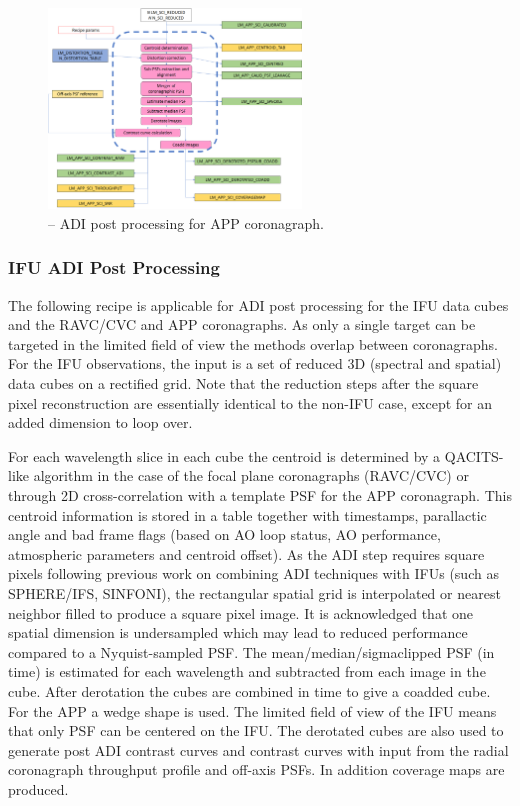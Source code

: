 \begin{figure}[hb]
  \centering
  \includegraphics[width=0.6\textwidth]{./figures/metis_lm_adi_app}
  \caption[Recipe: ]{ -- ADI post processing for APP coronagraph.
    }
  \label{fig:metis_lm_adi_app}
\end{figure}



\subsubsection{IFU ADI Post Processing}
\label{sssec:adi_ifu}


The following recipe is applicable for ADI post processing for the IFU
data cubes and the RAVC/CVC and APP coronagraphs. As only a single
target can be targeted in the limited field of view the methods
overlap between coronagraphs.  For the IFU observations, the input is
a set of reduced 3D (spectral and spatial) data cubes on a rectified
grid. Note that the reduction steps after the square pixel reconstruction
are essentially identical to the non-IFU case, except for an added dimension
to loop over. 

For each wavelength slice in each cube the centroid is determined by a
QACITS-like algorithm in the case of the focal plane coronagraphs
(RAVC/CVC) or through 2D cross-correlation with a template PSF for the
APP coronagraph. This centroid information is stored in a table
together with timestamps, parallactic angle and bad frame flags (based
on AO loop status, AO performance, atmospheric parameters and centroid
offset).  As the ADI step requires square pixels following previous
work on combining ADI techniques with IFUs (such as SPHERE/IFS,
SINFONI), the rectangular spatial grid is interpolated or nearest
neighbor filled to produce a square pixel image.  It is acknowledged
that one spatial dimension is undersampled which may lead to reduced
performance compared to a Nyquist-sampled PSF.  The
mean/median/sigmaclipped PSF (in time) is estimated for each
wavelength and subtracted from each image in the cube.  After
derotation the cubes are combined in time to give a coadded cube. For
the APP a wedge shape is used. The limited field of view of the IFU
means that only PSF can be centered on the IFU. The derotated cubes
are also used to generate post ADI contrast curves and contrast curves
with input from the radial coronagraph throughput profile and off-axis
PSFs. In addition coverage maps are produced.

